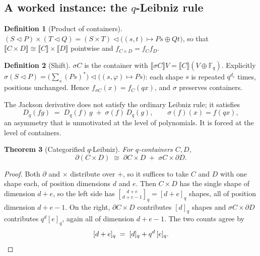 \documentclass[11pt,a4paper]{article}
\newtheorem{theorem}{Theorem}[section]
\theoremstyle{definition}
\newtheorem{definition}[theorem]{Definition}
\theoremstyle{remark}
\newcommand{\FF}{\mathbb{F}}
\newcommand{\ext}[1]{\llbracket #1 \rrbracket}
\newcommand{\con}{\triangleleft}
\newcommand{\qbin}[2]{\genfrac{[}{]}{0pt}{}{#1}{#2}_{q}}
\begin{document}
\begin{center}
\end{center}

\subsection{A worked instance: the \texorpdfstring{$q$}{q}-Leibniz rule}

\begin{definition}[Product of containers]\label{def:prod}
$(S \con P) \times (T \con Q) = (S \times T) \con \bigl((s,t) \mapsto P s \oplus Q t\bigr)$,
so that $\ext{C \times D} \cong \ext{C} \times \ext{D}$ pointwise and
$f_{C \times D} = f_C f_D$.
\end{definition}

\begin{definition}[Shift]\label{def:shift}
$\sigma C$ is the container with $\ext{\sigma C}V = \ext{C}(V \oplus \FF_q)$.
Explicitly $\sigma(S \con P) = \bigl(\sum_s (P s)^{*}\bigr) \con \bigl((s,\varphi)
\mapsto P s\bigr)$: each shape $s$ is repeated $q^{d_s}$ times, positions unchanged.
Hence $f_{\sigma C}(x) = f_C(qx)$, and $\sigma$ preserves containers.
\end{definition}

The Jackson derivative does not satisfy the ordinary Leibniz rule; it satisfies
\[
  D_q(fg) \;=\; D_q(f)\,g \;+\; \sigma(f)\,D_q(g),
  \qquad \sigma(f)(x) = f(qx),
\]
an asymmetry that is unmotivated at the level of polynomials. It is forced at the
level of containers.

\begin{theorem}[Categorified $q$-Leibniz]\label{thm:leibniz}
For $q$-containers $C, D$,
\[
  \partial(C \times D) \;\cong\; \partial C \times D \;+\; \sigma C \times \partial D .
\]
\end{theorem}

\begin{proof}
Both $\partial$ and $\times$ distribute over $+$, so it suffices to take
$C$ and $D$ with one shape each, of position dimensions $d$ and $e$. Then
$C \times D$ has the single shape of dimension $d+e$, so the left side has
$\qbin{d+e}{d+e-1} = [d+e]_q$ shapes, all of position dimension $d+e-1$. On the
right, $\partial C \times D$ contributes $[d]_q$ shapes and $\sigma C \times
\partial D$ contributes $q^{d}[e]_q$, again all of dimension $d+e-1$. The two counts
agree by
\[
  [d+e]_q \;=\; [d]_q + q^{d}\,[e]_q . \qedhere
\]
\end{proof}
\end{document}
